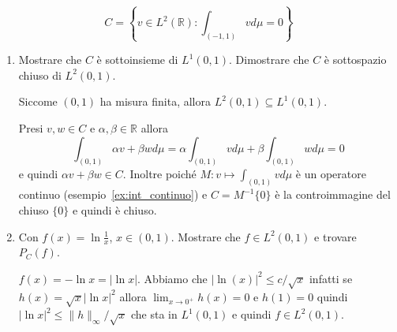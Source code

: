\begin{eser}
    \[
      C = \left\{v \in L^2{(\mathbb{R})} : \int_{(-1, 1)} v d\mu = 0\right\} 
    \]
\begin{enumerate}[label = \alph*)]
    \item Mostrare che \(C\) è sottoinsieme di \(L^{1}{(0, 1)}\). Dimostrare che
        \(C\) è sottospazio chiuso di \(L^2{(0, 1)}\). 

        Siccome \((0, 1)\) ha misura finita, allora \(L^2{(0, 1)} \subseteq
        L^1{(0, 1)}\). 

        Presi \(v, w \in C\) e \(\alpha, \beta \in \mathbb{R}\) allora
        \[
            \int_{(0,1)} \alpha v + \beta w d\mu = \alpha \int_{(0,1)} v d\mu +
            \beta \int_{(0,1)} w d\mu = 0
        \]
        e quindi \(\alpha v + \beta w \in C\). Inoltre poiché \(M : v \mapsto
        \int_{(0, 1)} v d\mu \) è un operatore continuo
        (esempio~\ref{ex:int_continuo}) e \(C = M^{-1}{\{0\}}\) è la
        controimmagine del chiuso \(\{0\}\) e quindi è chiuso.

    \item Con \(f{(x)} = \ln \frac{1}{x}\), \(x \in (0, 1)\). Mostrare
        che \(f \in L^{2}{(0, 1)}\) e trovare \(P_C{(f)}\). 

        \(f{(x)} = -\ln x = |\ln x|\). Abbiamo che \(\left| \ln {(x)} \right| ^2
        \le c / \sqrt{x}\) infatti se \(h{(x)} = \sqrt{x} \left| \ln x
        \right|^2\) allora \(\lim_{x \to 0^{+}} h{(x)} = 0\) e \(h{(1)} = 0\)
        quindi \(\left| \ln x \right| ^2 \le \|h\|_{\infty}  / \sqrt{x}\) che
        sta in \(L^{1}{(0, 1)}\) e quindi \(f \in L^{2}{(0, 1)}\).
\end{enumerate}

\end{eser}

